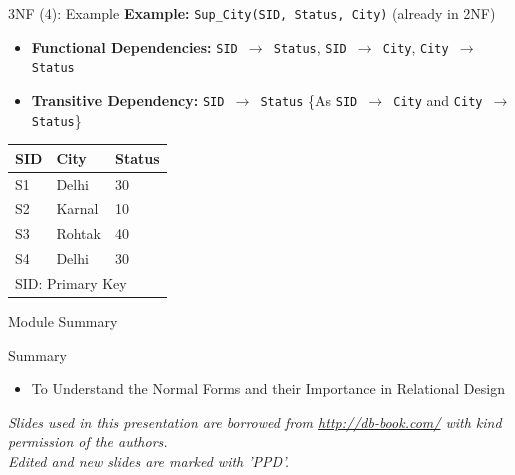 \documentclass[aspectratio=169, xcolor=dvipsnames]{beamer}
\begin{document}
\begin{frame}{3NF (4): Example}
    \textbf{Example:} \texttt{Sup\_City(SID, Status, City)} (already in 2NF)
    \begin{itemize}[<+->]
        \item \textbf{Functional Dependencies:} \texttt{SID $\rightarrow$ Status}, \texttt{SID $\rightarrow$ City}, \texttt{City $\rightarrow$ Status}
        \item \textbf{Transitive Dependency:} \texttt{SID $\rightarrow$ Status} \{As \texttt{SID $\rightarrow$ City} and \texttt{City $\rightarrow$ Status}\}
    \end{itemize}
    \begin{table}
    \centering
    \begin{tabular}{lll}
    \toprule
    \textbf{SID} & \textbf{City} & \textbf{Status} \\
    \midrule
    S1 & Delhi & 30 \\
    S2 & Karnal & 10 \\
    S3 & Rohtak & 40 \\
    S4 & Delhi & 30 \\
    \bottomrule
    \multicolumn{3}{l}{\footnotesize SID: Primary Key}
    \end{tabular}
    \end{table}
\end{frame}

\begin{frame}{Module Summary}
    \begin{block}{Summary}
        \begin{itemize}[<+->]
            \item To Understand the Normal Forms and their Importance in Relational Design
        \end{itemize}
    \end{block}
    \vspace{2em}
    \begin{center}
    \small \textit{Slides used in this presentation are borrowed from \url{http://db-book.com/} with kind permission of the authors.} \\
    \small \textit{Edited and new slides are marked with 'PPD'.}
    \end{center}
\end{frame}
\end{document}
